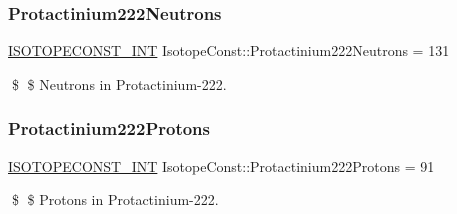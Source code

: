 \subsubsection{\texorpdfstring{Protactinium222\+Neutrons}{Protactinium222Neutrons}}
{\footnotesize\ttfamily \mbox{\hyperlink{group___isotope_const-_macros_ga5f18360b3e99483a35c32d789e62621c}{I\+S\+O\+T\+O\+P\+E\+C\+O\+N\+S\+T\+\_\+\+I\+NT}} Isotope\+Const\+::\+Protactinium222\+Neutrons = 131}

\$ \$ Neutrons in Protactinium-\/222. \mbox{\label{group___isotope_const-_protactinium-_pa222_ga8bd67a60986928870e3900baca7c1af3}} 
\subsubsection{\texorpdfstring{Protactinium222\+Protons}{Protactinium222Protons}}
{\footnotesize\ttfamily \mbox{\hyperlink{group___isotope_const-_macros_ga5f18360b3e99483a35c32d789e62621c}{I\+S\+O\+T\+O\+P\+E\+C\+O\+N\+S\+T\+\_\+\+I\+NT}} Isotope\+Const\+::\+Protactinium222\+Protons = 91}

\$ \$ Protons in Protactinium-\/222. 